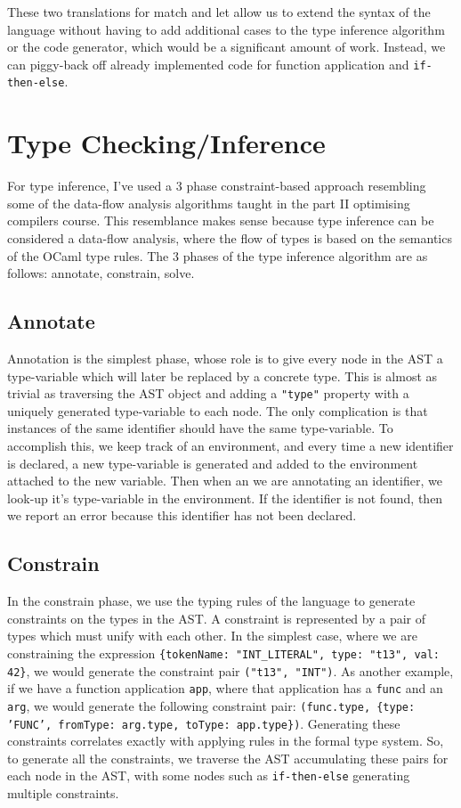 \documentclass[12pt,a4paper,twoside,openright]{report}
\begin{document}
These two translations for match and let allow us to extend the syntax of the language without having to add additional cases to the type inference algorithm or the code generator, which would be a significant amount of work.
Instead, we can piggy-back off already implemented code for function application and {\tt if-then-else}.
\section{Type Checking/Inference}
For type inference, I've used a 3 phase constraint-based approach resembling some of the data-flow analysis algorithms taught in the part II optimising compilers course.
This resemblance makes sense because type inference can be considered a data-flow analysis, where the flow of types is based on the semantics of the OCaml type rules.
The 3 phases of the type inference algorithm are as follows: annotate, constrain, solve.

\subsection{Annotate}
Annotation is the simplest phase, whose role is to give every node in the AST a type-variable which will later be replaced by a concrete type.
This is almost as trivial as traversing the AST object and adding a {\tt "type"} property with a uniquely generated type-variable to each node.
The only complication is that instances of the same identifier should have the same type-variable.
To accomplish this, we keep track of an environment, and every time a new identifier is declared, a new type-variable is generated and added to the environment attached to the new variable.
Then when an we are annotating an identifier, we look-up it's type-variable in the environment.
If the identifier is not found, then we report an error because this identifier has not been declared.
\subsection{Constrain}
In the constrain phase, we use the typing rules of the language to generate constraints on the types in the AST.
A constraint is represented by a pair of types which must unify with each other.
In the simplest case, where we are constraining the expression {\tt \{tokenName: "INT\_LITERAL", type: "t13", val: 42\}}, we would generate the constraint pair {\tt ("t13", "INT")}.
As another example, if we have a function application {\tt app}, where that application has a {\tt func} and an {\tt arg}, we would generate the following constraint pair: {\tt (func.type, \{type: 'FUNC', fromType: arg.type, toType: app.type\})}.
Generating these constraints correlates exactly with applying rules in the formal type system.
So, to generate all the constraints, we traverse the AST accumulating these pairs for each node in the AST, with some nodes such as {\tt if-then-else} generating multiple constraints.
\end{document}
